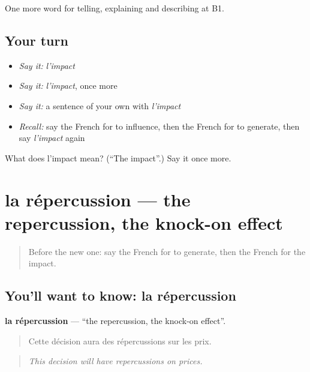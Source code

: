 \begin{grammarlens}[title={What you've built}]
One more word for telling, explaining and describing at B1.
\end{grammarlens}

\subsection*{Your turn}
\begin{itemize}
\raggedright
  \item \emph{Say it:} \emph{l'impact}
  \item \emph{Say it:} \emph{l'impact}, once more
  \item \emph{Say it:} a sentence of your own with \emph{l'impact}
  \item \emph{Recall:} say the French for to influence, then the French for to generate, then say \emph{l'impact} again
\end{itemize}

\begin{tcolorbox}[breakable,colback=teal!4,colframe=teal!35!black,title={Before you move on}]
What does l'impact mean? (\textquotedblleft{}The impact\textquotedblright{}.) Say it once more.
\end{tcolorbox}
\section[la répercussion]{la répercussion — the repercussion, the knock-on effect}

\label{lesson:FR-C350-repercussion}



\begin{quote}
Before the new one: say the French for to generate, then the French for the impact.
\end{quote}

\subsection*{You'll want to know: la répercussion}
\textbf{la répercussion} — \textquotedblleft{}the repercussion, the knock-on effect\textquotedblright{}.

\begin{quote}
Cette décision aura des répercussions sur les prix.
\end{quote}

\begin{quote}
\emph{This decision will have repercussions on prices.}
\end{quote}

